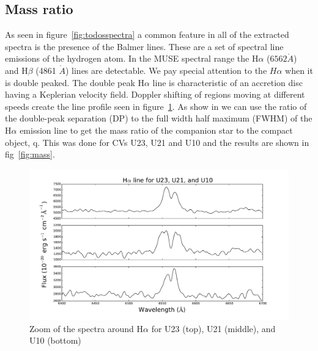 \subsection{Mass ratio}

As seen in figure~\ref{fig:todosspectra} a common feature in all of the extracted spectra is the presence of the Balmer lines. These are a set of spectral line emissions of the hydrogen atom. In the MUSE spectral range the H$\alpha$ ($6562 \mathring{A}$) and H$\beta$ (4861 $\mathring{A}$) lines are detectable. We pay special attention to the $H\alpha$ when it is double peaked. The double peak H$\alpha$ line is characteristic of an accretion disc having a Keplerian velocity field. Doppler shifting of regions moving at different speeds create the line profile seen in figure~\ref{fig:halphatodos}. As show in \cite{casares_massration_20016} we can use the ratio of the double-peak separation (DP) to the full width half maximum (FWHM) of the H$\alpha$ emission line to get the mass ratio of the companion star to the compact object, q. This was done for CVs U23, U21 and U10 and the results are shown in fig~\ref{fig:mass}.

\begin{figure}[h]
        \centering
        \includegraphics[scale=.5]{assets/images/todos.pdf}
\caption{Zoom of the spectra around H$\alpha$ for U23 (top), U21 (middle), and U10 (bottom)}
\label{fig:halphatodos}
\end{figure}


